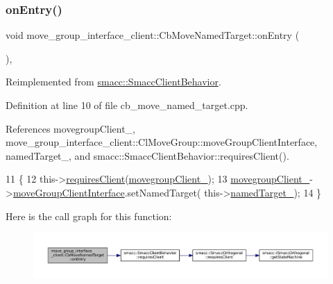 \subsubsection{\texorpdfstring{on\+Entry()}{onEntry()}}
{\footnotesize\ttfamily void move\+\_\+group\+\_\+interface\+\_\+client\+::\+Cb\+Move\+Named\+Target\+::on\+Entry (\begin{DoxyParamCaption}{ }\end{DoxyParamCaption})\hspace{0.3cm}{\ttfamily [override]}, {\ttfamily [virtual]}}



Reimplemented from \hyperlink{classsmacc_1_1SmaccClientBehavior_a7962382f93987c720ad432fef55b123f}{smacc\+::\+Smacc\+Client\+Behavior}.



Definition at line 10 of file cb\+\_\+move\+\_\+named\+\_\+target.\+cpp.



References movegroup\+Client\+\_\+, move\+\_\+group\+\_\+interface\+\_\+client\+::\+Cl\+Move\+Group\+::move\+Group\+Client\+Interface, named\+Target\+\_\+, and smacc\+::\+Smacc\+Client\+Behavior\+::requires\+Client().


\begin{DoxyCode}
11 \{
12     this->\hyperlink{classsmacc_1_1SmaccClientBehavior_a917f001e763a1059af337bf4e164f542}{requiresClient}(\hyperlink{classmove__group__interface__client_1_1CbMoveNamedTarget_acd7b16a1c38b103c0624fad1dfd99176}{movegroupClient\_});
13     \hyperlink{classmove__group__interface__client_1_1CbMoveNamedTarget_acd7b16a1c38b103c0624fad1dfd99176}{movegroupClient\_}->\hyperlink{classmove__group__interface__client_1_1ClMoveGroup_a5f0ea9b52695661b17605691168d1f31}{moveGroupClientInterface}.setNamedTarget(
      this->\hyperlink{classmove__group__interface__client_1_1CbMoveNamedTarget_a1e985a12ca30e0c6946a28940504f036}{namedTarget\_});
14 \}
\end{DoxyCode}
Here is the call graph for this function\+:
\nopagebreak
\begin{figure}[H]
\begin{center}
\leavevmode
\includegraphics[width=350pt]{classmove__group__interface__client_1_1CbMoveNamedTarget_afe138151340dafa14cb88051e82f0c8e_cgraph}
\end{center}
\end{figure}
\mbox{\label{classmove__group__interface__client_1_1CbMoveNamedTarget_a239d351bb9c2b579cc19ee993c792d2d}} 
